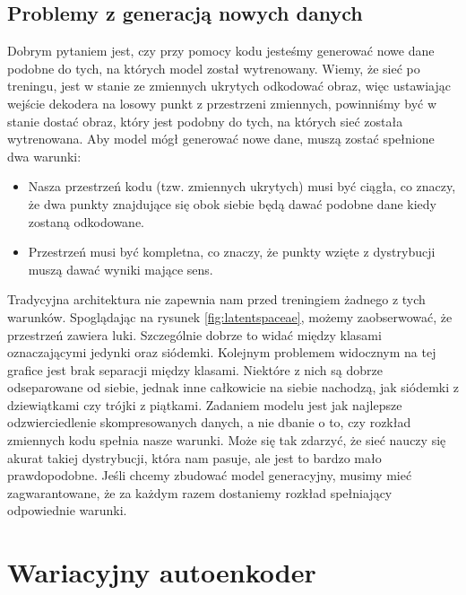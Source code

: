 \documentclass[a4paper,12pt,oneside]{book} %
\begin{document}
\section{Problemy z generacją nowych danych}
Dobrym pytaniem jest, czy przy pomocy kodu jesteśmy generować nowe dane podobne do tych, na których model został wytrenowany. Wiemy, że sieć po treningu, jest w stanie ze zmiennych ukrytych odkodować obraz, więc ustawiając wejście dekodera na losowy punkt z przestrzeni zmiennych, powinniśmy być w stanie dostać obraz, który jest podobny do tych, na których sieć została wytrenowana.
Aby model mógł generować nowe dane, muszą zostać spełnione dwa warunki:
\begin{itemize}
	\item Nasza przestrzeń kodu (tzw. zmiennych ukrytych) musi być ciągła, co znaczy, że dwa punkty znajdujące się obok siebie będą dawać podobne dane kiedy zostaną odkodowane.
	\item Przestrzeń musi być kompletna, co znaczy, że punkty wzięte z dystrybucji muszą dawać wyniki mające sens.
\end{itemize}
Tradycyjna architektura nie zapewnia nam przed treningiem żadnego z tych warunków.
Spoglądając na rysunek \ref{fig:latentspaceae}, możemy zaobserwować, że przestrzeń zawiera luki. Szczególnie dobrze to widać między klasami oznaczającymi jedynki oraz siódemki. Kolejnym problemem widocznym na tej grafice jest brak separacji między klasami. Niektóre z nich są dobrze odseparowane od siebie, jednak inne całkowicie na siebie nachodzą, jak siódemki z dziewiątkami czy trójki z piątkami. Zadaniem modelu jest jak najlepsze odzwierciedlenie skompresowanych danych, a nie dbanie o to, czy rozkład zmiennych kodu spełnia nasze warunki. Może się tak zdarzyć, że sieć nauczy się akurat takiej dystrybucji, która nam pasuje, ale jest to bardzo mało prawdopodobne. Jeśli chcemy zbudować model generacyjny, musimy mieć zagwarantowane, że za każdym razem dostaniemy rozkład spełniający odpowiednie warunki. 
\chapter{Wariacyjny autoenkoder}
\end{document}
